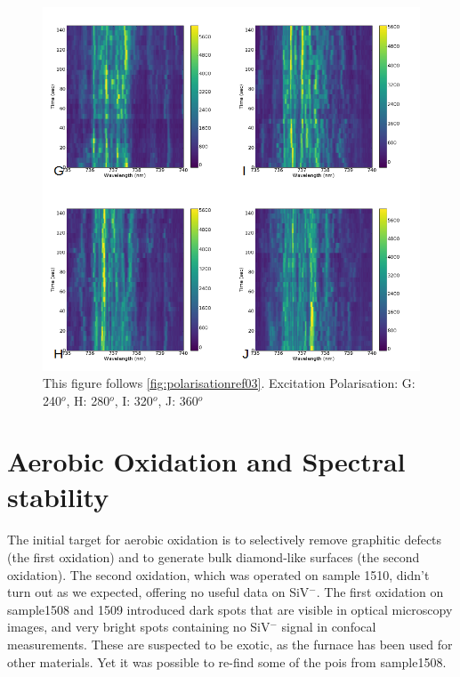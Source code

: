 \begin{figure}[h]
\centering
\includegraphics[width=1\linewidth]{Figures/pic/polarisationref03_2}
\caption{This figure follows \ref{fig:polarisationref03}. Excitation Polarisation: G: 240$^{o}$, H: 280$^{o}$, I: 320$^{o}$, J: 360$^{o}$ }
\label{fig:polarisationref032}
\end{figure}







\section{Aerobic Oxidation and Spectral stability}

\paragraph{}The initial target for aerobic oxidation is to selectively remove graphitic defects (the first oxidation) and to generate bulk diamond-like surfaces (the second oxidation). The second oxidation, which was operated on sample 1510, didn't turn out as we expected, offering no useful data on SiV$^{-}$. The first oxidation on sample1508 and 1509 introduced dark spots that are visible in optical microscopy images, and very bright spots containing no SiV$^{-}$ signal in confocal measurements. These are suspected to be exotic, as the furnace has been used for other materials. Yet it was possible to re-find some of the pois from sample1508.

